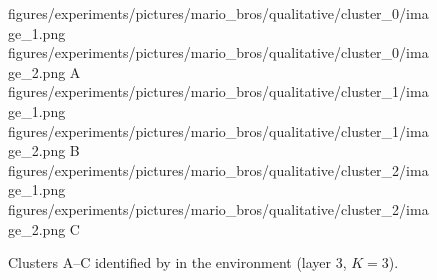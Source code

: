 \begin{figure}[H]
    \qualitativeClusterFigureSetup
    \qualitativeClusterTwo
        {figures/experiments/pictures/mario_bros/qualitative/cluster_0/image_1.png}
        {figures/experiments/pictures/mario_bros/qualitative/cluster_0/image_2.png}
        {A}
    \qualitativeClusterTwo
        {figures/experiments/pictures/mario_bros/qualitative/cluster_1/image_1.png}
        {figures/experiments/pictures/mario_bros/qualitative/cluster_1/image_2.png}
        {B}
    \qualitativeClusterTwo
        {figures/experiments/pictures/mario_bros/qualitative/cluster_2/image_1.png}
        {figures/experiments/pictures/mario_bros/qualitative/cluster_2/image_2.png}
        {C}
    \caption{Clusters A--C identified by  in the \MarioBrosName environment (layer 3, $K=3$).}
    \label{fig:qualitative_mario_bros}
\end{figure}
